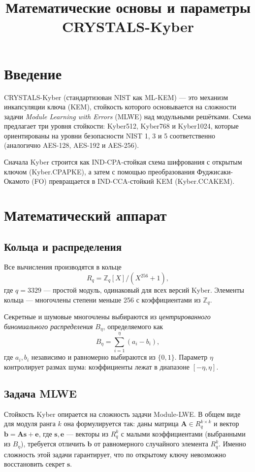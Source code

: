 \documentclass[11pt,a4paper]{article}
\title{Математические основы и параметры CRYSTALS-Kyber}
\author{}
\date{}
\begin{document}
\maketitle

\section{Введение}

CRYSTALS-Kyber (стандартизован NIST как ML-KEM) — это механизм инкапсуляции ключа (KEM), стойкость которого основывается на сложности задачи \emph{Module Learning with Errors} (MLWE) над модульными решётками. Схема предлагает три уровня стойкости: Kyber512, Kyber768 и Kyber1024, которые ориентированы на уровни безопасности NIST 1, 3 и 5 соответственно (аналогично AES-128, AES-192 и AES-256).

Сначала Kyber строится как IND-CPA-стойкая схема шифрования с открытым ключом (Kyber.CPAPKE), а затем с помощью преобразования Фуджисаки-Окамото (FO) превращается в IND-CCA-стойкий KEM (Kyber.CCAKEM).

\newpage
\section{Математический аппарат}

\subsection{Кольца и распределения}

Все вычисления производятся в кольце
\[
    R_q = \mathbb{Z}_q[X]/(X^{256}+1),
\]
где \(q = 3329\) — простой модуль, одинаковый для всех версий Kyber. Элементы кольца — многочлены степени меньше 256 с коэффициентами из \(\mathbb{Z}_q\).

Секретные и шумовые многочлены выбираются из \emph{центрированного биномиального распределения} \(B_\eta\), определяемого как
\[
    B_\eta = \sum_{i=1}^{\eta} (a_i - b_i),
\]
где \(a_i, b_i\) независимо и равномерно выбираются из \(\{0,1\}\). Параметр \(\eta\) контролирует размах шума: коэффициенты лежат в диапазоне \([-\eta, \eta]\).

\subsection{Задача MLWE}

Стойкость Kyber опирается на сложность задачи Module-LWE. В общем виде для модуля ранга \(k\) она формулируется так: даны матрица \(\mathbf{A} \in R_q^{k \times k}\) и вектор \(\mathbf{b} = \mathbf{A}\mathbf{s} + \mathbf{e}\), где \(\mathbf{s}, \mathbf{e}\) — векторы из \(R_q^k\) с малыми коэффициентами (выбранными из \(B_\eta\)), требуется отличить \(\mathbf{b}\) от равномерного случайного элемента \(R_q^k\). Именно сложность этой задачи гарантирует, что по открытому ключу невозможно восстановить секрет \(\mathbf{s}\).
\end{document}
